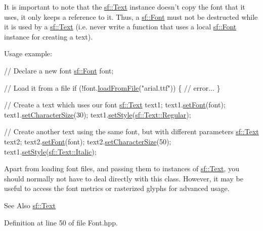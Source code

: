 It is important to note that the \hyperlink{classsf_1_1_text}{sf\-::\-Text} instance doesn't copy the font that it uses, it only keeps a reference to it. Thus, a \hyperlink{classsf_1_1_font}{sf\-::\-Font} must not be destructed while it is used by a \hyperlink{classsf_1_1_text}{sf\-::\-Text} (i.\-e. never write a function that uses a local \hyperlink{classsf_1_1_font}{sf\-::\-Font} instance for creating a text).

Usage example\-: 
\begin{DoxyCode}
\textcolor{comment}{// Declare a new font}
\hyperlink{classsf_1_1_font}{sf::Font} font;

\textcolor{comment}{// Load it from a file}
\textcolor{keywordflow}{if} (!font.\hyperlink{classsf_1_1_font_ab020052ef4e01f6c749a85571c0f3fd1}{loadFromFile}(\textcolor{stringliteral}{"arial.ttf"}))
\{
    \textcolor{comment}{// error...}
\}

\textcolor{comment}{// Create a text which uses our font}
\hyperlink{classsf_1_1_text}{sf::Text} text1;
text1.\hyperlink{classsf_1_1_text_a2927805d1ae92d57f15034ea34756b81}{setFont}(font);
text1.\hyperlink{classsf_1_1_text_ae96f835fc1bff858f8a23c5b01eaaf7e}{setCharacterSize}(30);
text1.\hyperlink{classsf_1_1_text_ad791702bc2d1b6590a1719aa60635edf}{setStyle}(\hyperlink{classsf_1_1_text_aa8add4aef484c6e6b20faff07452bd82a2af9ae5e1cda126570f744448e0caa32}{sf::Text::Regular});

\textcolor{comment}{// Create another text using the same font, but with different parameters}
\hyperlink{classsf_1_1_text}{sf::Text} text2;
text2.\hyperlink{classsf_1_1_text_a2927805d1ae92d57f15034ea34756b81}{setFont}(font);
text2.\hyperlink{classsf_1_1_text_ae96f835fc1bff858f8a23c5b01eaaf7e}{setCharacterSize}(50);
text1.\hyperlink{classsf_1_1_text_ad791702bc2d1b6590a1719aa60635edf}{setStyle}(\hyperlink{classsf_1_1_text_aa8add4aef484c6e6b20faff07452bd82aee249eb803848723c542c2062ebe69d8}{sf::Text::Italic});
\end{DoxyCode}


Apart from loading font files, and passing them to instances of \hyperlink{classsf_1_1_text}{sf\-::\-Text}, you should normally not have to deal directly with this class. However, it may be useful to access the font metrics or rasterized glyphs for advanced usage.

\begin{DoxySeeAlso}{See Also}
\hyperlink{classsf_1_1_text}{sf\-::\-Text} 
\end{DoxySeeAlso}


Definition at line 50 of file Font.\-hpp.



